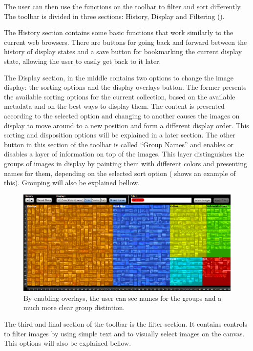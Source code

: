 The user can then use the functions on the toolbar to filter and sort differently. The toolbar is divided in three sections: History, Display and Filtering ().

The History section contains some basic functions that work similarly to the current web browsers. There are buttons for going back and forward between the history of display states and a save button for bookmarking the current display state, allowing the user to easily get back to it later.

The Display section, in the middle contains two options to change the image display: the sorting options and the display overlays button. The former presents the available sorting options for the current collection, based on the available metadata and on the best ways to display them. The content is presented according to the selected option and changing to another causes the images on display to move around to a new position and form a different display order. This sorting and disposition options will be explained in a later section.
The other button in this section of the toolbar is called ``Group Names'' and enables or disables a layer of information on top of the images. This layer distinguishes the groups of images in display by painting them with different colors and presenting names for them, depending on the selected sort option ( shows an example of this). Grouping will also be explained bellow. 

\begin{figure}[htbp]
	\centering
		\includegraphics[width=\linewidth]{Figures/overlays.png}
	\caption{By enabling overlays, the user can see names for the groups and a much more clear group distintion.}
	\label{fig:overlays}
\end{figure}

The third and final section of the toolbar is the filter section. It contains controls to filter images by using simple text and to visually select images on the canvas. This options will also be explained bellow.



